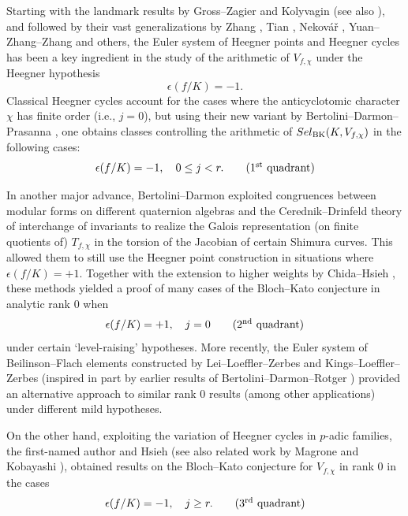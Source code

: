 \documentclass[10pt,letterpaper]{amsart}
\theoremstyle{plain}
\theoremstyle{definition}
\theoremstyle{definition}
\theoremstyle{plain}
\theoremstyle{plain}
\theoremstyle{plain}
\theoremstyle{remark}
\numberwithin{equation}{section}
\newcommand{\Sel}{Sel}
\newcommand{\ts}{\textsuperscript}
\def\Sel{{\rm Sel}}
\begin{document}
{Starting with the landmark results by Gross--Zagier and Kolyvagin \cite{GZ,kol88} (see also \cite{BD-crelle}), and followed by their vast generalizations by Zhang \cite{zhang130}, Tian \cite{Tian-PhD}, Nekov{\'a}{\v{r}} \cite{nekovar-CM}, Yuan--Zhang--Zhang \cite{YZZ-GZ} and others, the Euler system of Heegner points and Heegner cycles has been a key ingredient in the study of the arithmetic of $V_{f,\chi}$ under the Heegner hypothesis
\[
\epsilon(f/K)=-1.
\]
Classical Heegner cycles account for the cases where the anticyclotomic character $\chi$ has finite order (i.e., $j=0$), but using their new variant by Bertolini--Darmon--Prasanna \cite{bdp1}, one obtains classes controlling the arithmetic of $\Sel_{\mathrm{BK}}(K,V_{f,\chi})$ in the following cases:
\begin{equation}\label{eq:1}
\epsilon(f/K)=-1,\quad 0\leq j<r.\tag{1\ts{st} quadrant}
\end{equation} 

In another major advance, Bertolini--Darmon \cite{bdIMC} exploited congruences between modular forms on different quaternion algebras and the Cerednik--Drinfeld theory of interchange of invariants to realize the Galois representation (on finite quotients of) $T_{f,\chi}$ in the torsion of the Jacobian of certain Shimura curves. This allowed them to still use the Heegner point construction in situations where $\epsilon(f/K)=+1$. Together with the extension to higher weights by Chida--Hsieh \cite{ChHs2}, these methods yielded a proof of many cases of the Bloch--Kato conjecture in analytic rank $0$ when
\begin{equation}\label{eq:2}
\epsilon(f/K)=+1,\quad j=0\tag{2\ts{nd} quadrant}
\end{equation} 
under certain `level-raising' hypotheses. More recently, the Euler system of Beilinson--Flach elements  constructed by Lei--Loeffler--Zerbes \cite{LLZ,LLZ-K} and Kings--Loeffler--Zerbes \cite{KLZ,KLZ-AJM} (inspired in part by earlier results of Bertolini--Darmon--Rotger \cite{BDR1,BDR2}) provided an alternative approach to similar rank $0$ results (among other applications) under different mild hypotheses.

On the other hand, %
exploiting the variation of Heegner cycles in $p$-adic families, the first-named  author and Hsieh \cite{cas-hsieh1,cas-2var} (see also related work by Magrone \cite{Magr} and Kobayashi \cite{kobayashi-GHC}),  obtained results on the Bloch--Kato conjecture for $V_{f,\chi}$ in rank $0$ in the cases
\begin{equation}\label{eq:3}
\epsilon(f/K)=-1,\quad j\geq r.\tag{3\ts{rd} quadrant}
\end{equation} 

}
\end{document}
